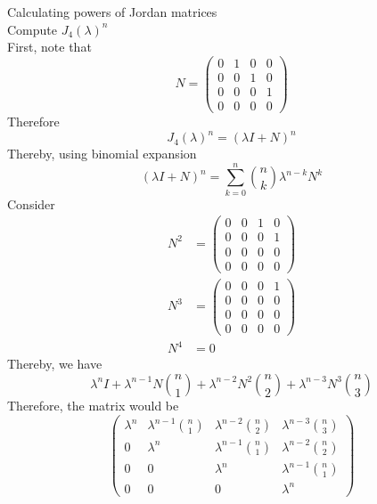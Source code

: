 \documentclass[journal, letterpaper]{IEEEtran}
\begin{document}
    \begin{myboxg}{Calculating powers of Jordan matrices} \\
        Compute $J_4(\lambda)^n$
        \newline \\ 
        First, note that 
        $$ N = \begin{pmatrix}
            0 & 1 & 0 & 0 \\
            0 & 0 & 1 & 0 \\
            0 & 0 & 0 & 1 \\
            0 & 0 & 0 & 0
        \end{pmatrix}$$
        Therefore
        $$ J_4(\lambda)^n = (\lambda I + N)^n$$
        Thereby, using binomial expansion
        $$(\lambda I + N)^n = \sum_{k=0}^{n} \binom{n}{k} \lambda^{n-k} N^k$$
        Consider 
        \begin{align*}
            N^2 &= \begin{pmatrix}
                0 & 0 & 1 & 0 \\
                0 & 0 & 0 & 1 \\
                0 & 0 & 0 & 0 \\
                0 & 0 & 0 & 0
            \end{pmatrix} \\ 
            N^3 &= \begin{pmatrix}
                0 & 0 & 0 & 1 \\
                0 & 0 & 0 & 0 \\
                0 & 0 & 0 & 0 \\
                0 & 0 & 0 & 0
            \end{pmatrix} \\
            N^4 &= 0
        \end{align*}
        Thereby, we have
        $$ \lambda^n I + \lambda^{n-1} N\binom{n}{1} + \lambda^{n-2}N^2\binom{n}{2} + \lambda^{n-3}N^3 \binom{n}{3} $$
        Therefore, the matrix would be
        $$
        \begin{pmatrix}
            \lambda^n & \lambda^{n-1}\binom{n}{1} & \lambda^{n-2}\binom{n}{2} & \lambda^{n-3}\binom{n}{3} \\ 
            0 & \lambda^n & \lambda^{n-1}\binom{n}{1} & \lambda^{n-2}\binom{n}{2} \\ 
            0 & 0 & \lambda^n & \lambda^{n-1}\binom{n}{1} \\ 
            0 & 0 & 0 & \lambda^n
        \end{pmatrix}
        $$
    \end{myboxg}
\end{document}

